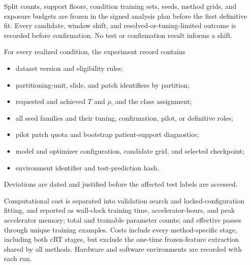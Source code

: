 \documentclass[11pt]{article}
\begin{document}
Split counts, support floors, condition training sets, seeds, method grids, and exposure budgets are frozen in the signed analysis plan before the first definitive fit. Every candidate, window shift, and resolved-or-tuning-limited outcome is recorded before confirmation. No test or confirmation result informs a shift.

For every realized condition, the experiment record contains
\begin{itemize}\setlength{\itemsep}{1pt}
  \item dataset version and eligibility rules;
  \item partitioning-unit, slide, and patch identifiers by partition;
  \item requested and achieved $T$ and $\rho$, and the class assignment;
  \item all seed families and their tuning, confirmation, pilot, or definitive roles;
  \item pilot patch quota and bootstrap patient-support diagnostics;
  \item model and optimizer configuration, candidate grid, and selected checkpoint;
  \item environment identifier and test-prediction hash.
\end{itemize}
\noindent Deviations are dated and justified before the affected test labels are accessed.

Computational cost is separated into validation search and locked-configuration fitting, and reported as wall-clock training time, accelerator-hours, and peak accelerator memory; total and trainable parameter counts; and effective passes through unique training examples. Costs include every method-specific stage, including both cRT stages, but exclude the one-time frozen-feature extraction shared by all methods. Hardware and software environments are recorded with each run.
\end{document}
